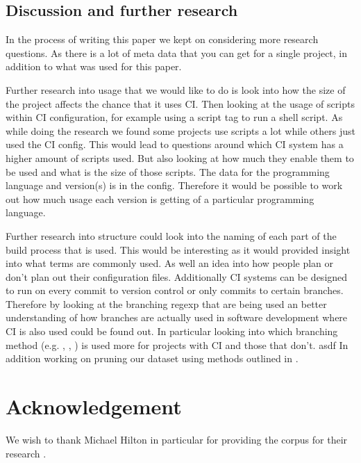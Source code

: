 \documentclass[twoside,12pt,titlepage,a4paper]{article}
\begin{document}
\vspace*{-0.05in}
\subsection{Discussion and further research}
\vspace*{-0.05in}
In the process of writing this paper we kept on considering more research questions. As there is a lot of meta data that you can get for a single project, in addition to what was used for this paper.

Further research into usage that we would like to do is look into how the size of the project affects the chance that it uses CI. Then looking at the usage of scripts within CI configuration, for example using a script tag to run a shell script. As while doing the research we found some projects use scripts a lot while others just used the CI config. This would lead to questions around which CI system has a higher amount of scripts used. But also looking at how much they enable them to be used and what is the size of those scripts.
The data for the programming language and version(s) is in the config. Therefore it would be possible to work out how much usage each version is getting of a particular programming language.

Further research into structure could look into the naming of each part of the build process that is used. This would be interesting as it would provided insight into what terms are commonly used. As well an idea into how people plan or don't plan out their configuration files.
Additionally CI systems can be designed to run on every commit to version control or only commits to certain branches. Therefore by looking at the branching regexp that are being used an better understanding of how branches are actually used in software development where CI is also used could be found out. In particular looking into which branching method (e.g. \cite{BranchGITFLOW2010}, \cite{BranchGITHUBFLOW2017}, \cite{BranchTrunk2013}) is used more for projects with CI and those that don't. 
asdf
In addition working on pruning our dataset using methods outlined in \cite{Kalliamvakou2014}. 



\section{Acknowledgement}
We wish to thank Michael Hilton in particular for providing the corpus for their research \citet{Hilton2016}. 




\vskip 0.2in


\end{document}

